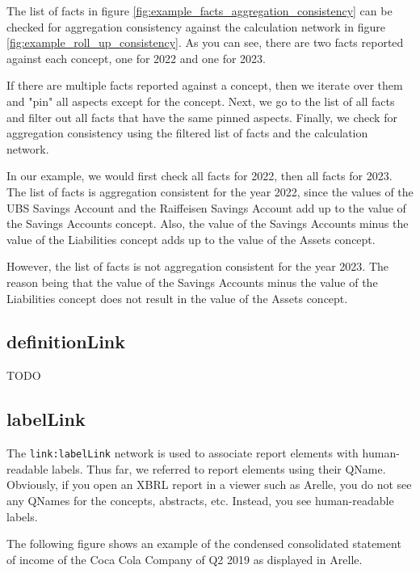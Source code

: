 The list of facts in figure \ref{fig:example_facts_aggregation_consistency} can be checked for aggregation consistency against the calculation network in figure \ref{fig:example_roll_up_consistency}.
As you can see, there are two facts reported against each concept, one for 2022 and one for 2023.

If there are multiple facts reported against a concept, then we iterate over them and "pin" all aspects except for the concept.
Next, we go to the list of all facts and filter out all facts that have the same pinned aspects.
Finally, we check for aggregation consistency using the filtered list of facts and the calculation network.

In our example, we would first check all facts for 2022, then all facts for 2023.
The list of facts is aggregation consistent for the year 2022, since the values of the UBS Savings Account and the Raiffeisen Savings Account add up to the value of the Savings Accounts concept.
Also, the value of the Savings Accounts minus the value of the Liabilities concept adds up to the value of the Assets concept.

However, the list of facts is not aggregation consistent for the year 2023.
The reason being that the value of the Savings Accounts minus the value of the Liabilities concept does not result in the value of the Assets concept.

\subsection{definitionLink}

TODO

\subsection{labelLink}
\label{sec:labelLink}

The \texttt{link:labelLink} network is used to associate report elements with human-readable labels.
Thus far, we referred to report elements using their QName.
Obviously, if you open an XBRL report in a viewer such as Arelle, you do not see any QNames for the concepts, abstracts, etc.
Instead, you see human-readable labels.

The following figure shows an example of the condensed consolidated statement of income of the Coca Cola Company\cite{ko2019q2} of Q2 2019 as displayed in Arelle\cite{arelle}.

